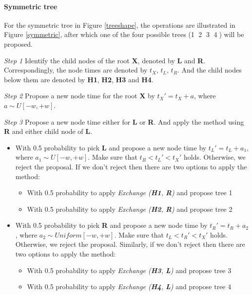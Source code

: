 \documentclass{bmcart}
\begin{document}
\paragraph*{Symmetric tree}

For the symmetric tree in Figure \ref{treeshape}, the operations are illustrated in Figure \ref{symmetric}, after which one of the four possible trees (\textcircled1 \textcircled2 \textcircled3 \textcircled4) will be proposed.

\emph{Step 1} Identify the child nodes of the root \textbf{X}, denoted by \textbf{L} and \textbf{R}. Correspondingly, the node times are denoted by $t_X$, $t_L$, $t_R$. And the child nodes below them are denoted by \textbf{H1}, \textbf{H2}, \textbf{H3} and \textbf{H4}.

\emph{Step 2} Propose a new node time for the root \textbf{X} by ${t_X}' = {t_X} + a$, where $a \sim U[ - w, + w]$.

\emph{Step 3} Propose a new node time either for \textbf{L} or \textbf{R}. And apply the method using \textbf{R} and either child node of \textbf{L}.
\begin{itemize}
\item With 0.5 probability to pick \textbf{L} and propose a new node time by ${t_L}' = {t_L} + {a_1}$, where ${a_1} \sim U[ - w, + w]$. Make sure that ${t_R} < {t_L}' < {t_X}'$ holds. Otherwise, we reject the proposal. If we don't reject then there are two options to apply the method:
\begin{itemize}
\item With 0.5 probability to apply \textit{Exchange (\textbf{H1}, \textbf{R})} and propose tree \textcircled1

\item With 0.5 probability to apply \textit{Exchange (\textbf{H2}, \textbf{R})} and propose tree \textcircled2
\end{itemize}

\item With 0.5 probability to pick \textbf{R} and propose a new node time by ${t_R}' = {t_R} + {a_2}$, where ${a_2} \sim Uniform[ - w, + w]$. Make sure that ${t_L} < {t_R}' < {t_X}'$ holds. Otherwise, we reject the proposal. Similarly, if we don't reject then there are two options to apply the method:
  \begin{itemize}
  \item With 0.5 probability to apply \textit{Exchange (\textbf{H3}, \textbf{L})} and propose tree \textcircled3
  \item With 0.5 probability to apply \textit{Exchange (\textbf{H4}, \textbf{L})} and propose tree \textcircled4
  \end{itemize}
\end{itemize}
\end{document}

